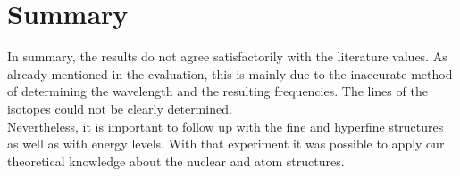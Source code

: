 \chapter{Summary}
In summary, the results do not agree satisfactorily with the literature values.
As already mentioned in the evaluation, this is mainly due to the inaccurate method of determining the wavelength and the resulting frequencies.
The lines of the isotopes could not be clearly determined.\\
Nevertheless, it is important to follow up with the fine and hyperfine structures as well as with 
energy levels. 
With that experiment it was possible to apply our theoretical knowledge about the nuclear and atom structures.